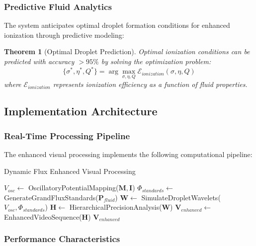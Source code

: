 \documentclass[11pt,a4paper]{article}
\newtheorem{theorem}{Theorem}[section]
\theoremstyle{remark}
\begin{document}
\subsubsection{Predictive Fluid Analytics}

The system anticipates optimal droplet formation conditions for enhanced ionization through predictive modeling:

\begin{theorem}[Optimal Droplet Prediction]
Optimal ionization conditions can be predicted with accuracy $> 95\%$ by solving the optimization problem:
\begin{equation}
\{\sigma^*, \eta^*, Q^*\} = \arg\max_{\sigma,\eta,Q} \mathcal{E}_{ionization}(\sigma, \eta, Q)
\end{equation}
where $\mathcal{E}_{ionization}$ represents ionization efficiency as a function of fluid properties.
\end{theorem}

\subsection{Implementation Architecture}

\subsubsection{Real-Time Processing Pipeline}

The enhanced visual processing implements the following computational pipeline:

\begin{algorithm}
\caption{Dynamic Flux Enhanced Visual Processing}
\begin{algorithmic}[1]
\State $V_{osc} \leftarrow$ OscillatoryPotentialMapping($\mathbf{M}, \mathbf{I}$)
\State $\Phi_{standards} \leftarrow$ GenerateGrandFluxStandards($\mathbf{P}_{fluid}$)
\State $\mathbf{W} \leftarrow$ SimulateDropletWavelets($V_{osc}, \Phi_{standards}$)
\State $\mathbf{H} \leftarrow$ HierarchicalPrecisionAnalysis($\mathbf{W}$)
\State $\mathbf{V}_{enhanced} \leftarrow$ EnhancedVideoSequence($\mathbf{H}$)
\State \Return $\mathbf{V}_{enhanced}$
\EndProcedure
\end{algorithmic}
\end{algorithm}

\subsubsection{Performance Characteristics}
\end{document}

